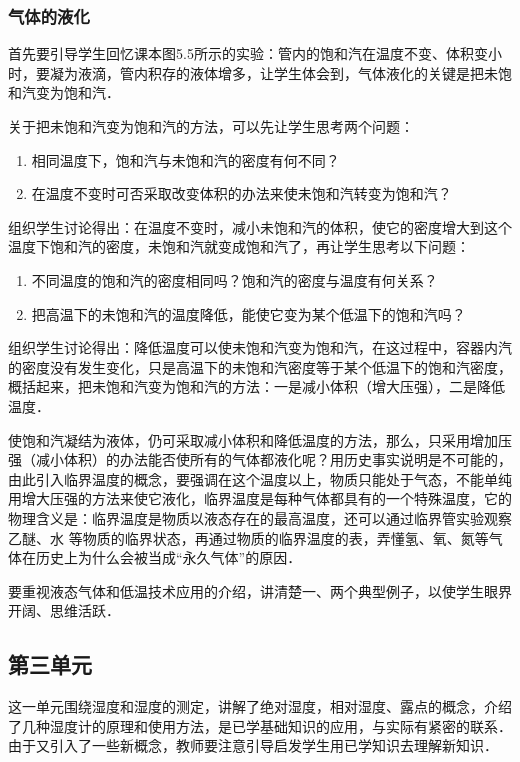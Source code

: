 \subsubsection{气体的液化}

首先要引导学生回忆课本图5.5所示的实验：管内的饱和汽在温度不变、体积变小时，要凝为液滴，管内积存的液体增多，让学生体会到，气体液化的关键是把未饱和汽变为饱和汽．

关于把未饱和汽变为饱和汽的方法，可以先让学生思考两个问题：
\begin{enumerate}
    \item 相同温度下，饱和汽与未饱和汽的密度有何不同？
    \item 在温度不变时可否采取改变体积的办法来使未饱和汽转变为饱和汽？
\end{enumerate}
组织学生讨论得出：在温度不变时，减小未饱和汽的体积，使它的密度增大到这个温度下饱和汽的密度，未饱和汽就变成饱和汽了，再让学生思考以下问题：
\begin{enumerate}
\item 不同温度的饱和汽的密度相同吗？饱和汽的密度与温度有何关系？    \item 把高温下的未饱和汽的温度降低，能使它变为某个低温下的饱和汽吗？
\end{enumerate}
组织学生讨论得出：降低温度可以使未饱和汽变为饱和汽，在这过程中，容器内汽的密度没有发生变化，只是高温下的未饱和汽密度等于某个低温下的饱和汽密度，概括起来，把未饱和汽变为饱和汽的方法：一是减小体积（增大压强），二是降低温度．

使饱和汽凝结为液体，仍可采取减小体积和降低温度的方法，那么，只采用增加压强（减小体积）的办法能否使所有的气体都液化呢？用历史事实说明是不可能的，由此引入临界温度的概念，要强调在这个温度以上，物质只能处于气态，不能单纯用增大压强的方法来使它液化，临界温度是每种气体都具有的一个特殊温度，它的物理含义是：临界温度是物质以液态存在的最高温度，还可以通过临界管实验观察乙醚、水
等物质的临界状态，再通过物质的临界温度的表，弄懂氢、氧、氮等气体在历史上为什么会被当成“永久气体”的原因．

要重视液态气体和低温技术应用的介绍，讲清楚一、两个典型例子，以使学生眼界开阔、思维活跃．

\subsection{第三单元}
这一单元围绕湿度和湿度的测定，讲解了绝对湿度，相对湿度、露点的概念，介绍了几种湿度计的原理和使用方法，是已学基础知识的应用，与实际有紧密的联系．由于又引入了一些新概念，教师要注意引导启发学生用已学知识去理解新知识．


